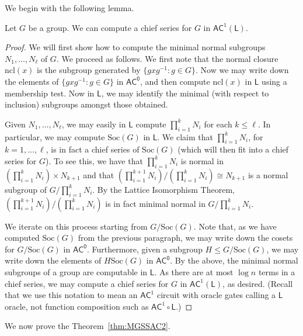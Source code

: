\documentclass{article}
\newcommand{\Soc}{\text{Soc}}
\newcommand*{\ComplexityClass}[1]{\ensuremath{\mathsf{#1}}\xspace}
\newcommand*{\LogSpace}{\ComplexityClass{L}}
\newcommand{\AC}{\ComplexityClass{AC}}
\newcommand{\ACz}{\ComplexityClass{AC^0}}
\begin{document}
We begin with the following lemma.

\begin{lemma} \label{lem:ChiefSeriesSAC2}
Let $G$ be a group. We can compute a chief series for $G$ in $\AC^{1}(\LogSpace)$.
\end{lemma}

\begin{proof}
We will first show how to compute the minimal normal subgroups $N_{1}, \ldots, N_{\ell}$ of $G$. We proceed as follows. We first note that the normal closure $\text{ncl}(x)$ is the subgroup generated by $\{ gxg^{-1} : g \in G \}$. Now we may write down the elements of $\{ gxg^{-1} : g \in G \}$ in $\ACz$, and then compute $\text{ncl}(x)$ in $\LogSpace$ using a membership test. Now in $\LogSpace$, we may identify the minimal (with respect to inclusion) subgroups amongst those obtained. 

Given $N_{1}, \ldots, N_{\ell}$, we may easily in $\LogSpace$ compute $\prod_{i=1}^{k} N_{i}$ for each $k \leq \ell$. In particular, we may compute $\Soc(G)$ in $\LogSpace$. 
We claim that $\prod_{i=1}^k N_i$, for $k=1,\dotsc,\ell$, is in fact a chief series of $\Soc(G)$ (which will then fit into a chief series for $G$). To see this, we have that $\prod _{i=1} ^k N_i$ is normal in $\left( \prod _{i=1} ^k N_i \right) \times N_{k+1}$ and that $(\prod _{i=1} ^{k+1} N_i ) / (\prod _{i=1} ^{k} N_i ) \cong N_{k+1}$ is a normal subgroup of $G / \prod_{i=1} ^k N_i $. By the Lattice Isomorphism Theorem, $(\prod _{i=1} ^{k+1} N_i ) / (\prod _{i=1} ^{k} N_i )$ is in fact minimal normal in $G / \prod_{i=1} ^k N_i $.

We iterate on this process starting from $G/\Soc(G)$. Note that, as we have computed  $\Soc(G)$ from the previous paragraph, we may write down the cosets for $G/\Soc(G)$ in $\ACz$. Furthermore, given a subgroup $H \leq G/\Soc(G)$, we may write down the elements of  $H\Soc(G)$ in $\ACz$. By the above, the minimal normal subgroups of a group are computable in $\LogSpace$. 
As there are at most $\log n$ terms in a chief series, we may compute a chief series for $G$ in $\AC^{1}(\LogSpace)$, as desired.  
(Recall that we use this notation to mean an $\AC^1$ circuit with oracle gates calling a $\LogSpace$ oracle, not function composition such as $\AC^1 \circ \LogSpace$.)
\end{proof}

We now prove the Theorem~\ref{thm:MGSSAC2}.
\end{document}
